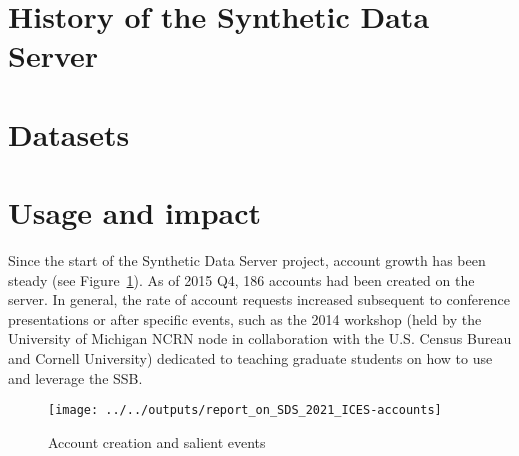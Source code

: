 
\section{History of the Synthetic Data Server}



%

\section{Datasets}


\section{Usage and impact}
Since the start of the Synthetic Data Server project, account growth has been steady (see Figure~\ref{fig:accounts}). As of 2015 Q4, 186 accounts had been created on the server. In general, the rate of account requests increased subsequent to conference presentations or after specific events, such as the 2014 workshop (held by the University of Michigan NCRN node in collaboration with the U.S. Census Bureau and Cornell University) dedicated to teaching graduate students on how to use and leverage the \ac{SSB}.

\begin{figure}
\centering
\caption{Account creation and salient events\label{fig:accounts}}
\texttt{[image: ../../outputs/report\_on\_SDS\_2021\_ICES-accounts]}
\end{figure}


